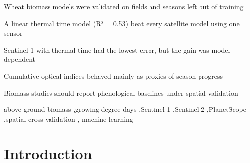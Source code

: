 \documentclass[
  english,
  review,
  number,
  sort,compress,
  authoryear,
  3p]{elsarticle}
\begin{document}
\begin{frontmatter}
\begin{highlights}
\item Wheat biomass models were validated on fields and seasons left out
of training\item A linear thermal time model (R² = 0.53) beat every
satellite model using one sensor\item Sentinel-1 with thermal time had
the lowest error, but the gain was model dependent\item Cumulative
optical indices behaved mainly as proxies of season
progress\item Biomass studies should report phenological baselines under
spatial validation
\end{highlights}


\begin{keyword}
    above-ground biomass \sep growing degree
days \sep Sentinel‑1 \sep Sentinel‑2 \sep PlanetScope \sep spatial
cross-validation \sep 
    machine learning
\end{keyword}
\end{frontmatter}
    

\section{Introduction}\label{introduction}
\end{document}
